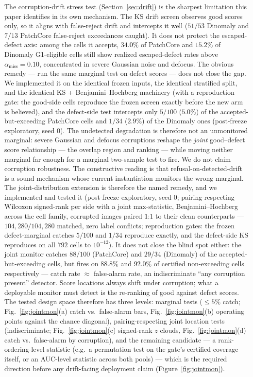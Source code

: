 \documentclass[preprint,11pt]{elsarticle}
\begin{document}
The corruption-drift stress test (Section~\ref{sec:drift}) is the sharpest limitation this paper
identifies in its own mechanism. The KS drift screen observes good scores only, so it aligns with
false-reject drift and intercepts it well ($51/53$ Dinomaly and $7/13$ PatchCore false-reject
exceedances caught). It does not protect the escaped-defect axis: among the cells it accepts,
$34.0\%$ of PatchCore and $15.2\%$ of Dinomaly G1-eligible cells still show realized escaped-defect
rates above $\alpha_{\text{miss}}=0.10$, concentrated in severe Gaussian noise and defocus. The
obvious remedy --- run the same marginal test on defect scores --- does not close the gap. We
implemented it on the identical frozen inputs, the identical stratified split, and the identical
KS + Benjamini--Hochberg machinery (with a reproduction gate: the good-side cells reproduce the
frozen screen exactly before the new arm is believed), and the defect-side test intercepts only
$5/100$ ($5.0\%$) of the accepted-but-exceeding PatchCore cells and $1/34$ ($2.9\%$) of the
Dinomaly ones (post-freeze exploratory, seed 0). The undetected degradation is therefore not an
unmonitored marginal: severe Gaussian and defocus corruptions reshape the \emph{joint}
good--defect score relationship --- the overlap region and ranking --- while moving neither
marginal far enough for a marginal two-sample test to fire. We do not claim corruption
robustness. The constructive reading is that refusal-on-detected-drift is a sound mechanism
whose current instantiation monitors the wrong marginal. The joint-distribution extension is
therefore the named remedy, and we implemented and tested it (post-freeze exploratory, seed 0;
pairing-respecting Wilcoxon signed-rank per side with a joint max-statistic, Benjamini--Hochberg
across the cell family, corrupted images paired 1:1 to their clean counterparts --- $104{,}280/104{,}280$
matched, zero label conflicts; reproduction gates: the frozen defect-marginal catches $5/100$ and
$1/34$ reproduce exactly, and the defect-side KS reproduces on all $792$ cells to $10^{-12}$).
It does not close the blind spot either: the joint monitor catches $88/100$ (PatchCore) and
$29/34$ (Dinomaly) of the accepted-but-exceeding cells, but fires on $88.8\%$ and $92.0\%$ of
certified non-exceeding cells respectively --- catch rate $\approx$ false-alarm rate, an
indiscriminate ``any corruption present'' detector. Score locations always shift under
corruption; what a deployable monitor must detect is the re-ranking of good against defect
scores. The tested design space therefore has three levels: marginal tests ($\le 5\%$ catch;
Fig.~\ref{fig:jointmon}(a) catch vs.\ false-alarm bars, Fig.~\ref{fig:jointmon}(b) operating
points against the chance diagonal),
pairing-respecting joint location tests (indiscriminate; Fig.~\ref{fig:jointmon}(c) signed-rank
$z$ clouds, Fig.~\ref{fig:jointmon}(d) catch vs.\ false-alarm by corruption), and the remaining candidate ---
a rank-ordering-level statistic (e.g.\ a permutation test on the gate's certified coverage
itself, or an AUC-level statistic across both pools) --- which is the required direction before
any drift-facing deployment claim (Figure~\ref{fig:jointmon}).
\end{document}
